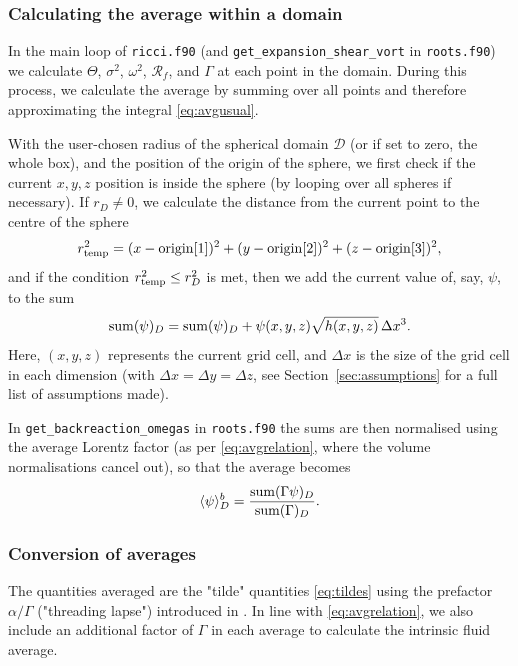 \documentclass[a4paper]{article}
\newcommand{\alp}{\alpha}
\newcommand{\Gam}{\Gamma}
\begin{document}
\subsubsection{Calculating the average within a domain}

In the main loop of \texttt{ricci.f90} (and \texttt{get\_expansion\_shear\_vort} in \texttt{roots.f90}) we calculate $\Theta$, $\sigma^2$, $\omega^2$, $\mathcal{R}_f$, and $\Gamma$ at each point in the domain. During this process, we calculate the average by summing over all points and therefore approximating the integral \eqref{eq:avgusual}. 

With the user-chosen radius of the spherical domain $\mathcal{D}$ (or if set to zero, the whole box), and the position of the origin of the sphere, we first check if the current $x,y,z$ position is inside the sphere (by looping over all spheres if necessary). If $r_D \neq 0$, we calculate the distance from the current point to the centre of the sphere
\begin{equation}
	r_{\rm temp}^2 = (x - {\rm origin}[1])^2 + (y - {\rm origin}[2])^2 + (z - {\rm origin}[3])^2,
\end{equation}
and if the condition $r_{\rm temp}^2 \leq r_D^2$ is met, then we add the current value of, say, $\psi$, to the sum
\begin{equation}
	{\rm sum}(\psi)_D = {\rm sum}(\psi)_D + \psi(x,y,z) \sqrt{h(x,y,z)} \, \Delta x^3.
\end{equation}
Here, $(x,y,z)$ represents the current grid cell, and $\Delta x$ is the size of the grid cell in each dimension (with $\Delta x = \Delta y = \Delta z$, see Section~\ref{sec:assumptions} for a full list of assumptions made). 

In \texttt{get\_backreaction\_omegas} in \texttt{roots.f90} the sums are then normalised using the average Lorentz factor (as per \eqref{eq:avgrelation}, where the volume normalisations cancel out), so that the average becomes
\begin{align}
	\langle\psi\rangle^b_D = \frac{{\rm sum}(\Gam\psi)_D}{{\rm sum}(\Gam)_D}.
\end{align}


\subsubsection{Conversion of averages}

The quantities averaged are the "tilde" quantities \eqref{eq:tildes} using the prefactor $\alp/\Gam$ ("threading lapse") introduced in \citet{buchert2019}. In line with \eqref{eq:avgrelation}, we also include an additional factor of $\Gam$ in each average to calculate the intrinsic fluid average. 
\end{document}
